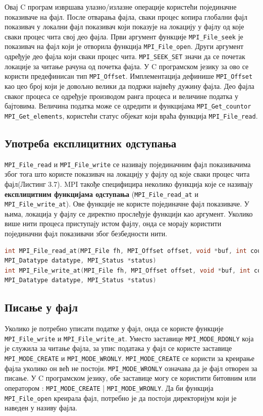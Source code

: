 Овај C програм извршава улазно/излазне операције користећи појединачне показиваче на фајл. После отварања фајла, сваки процес копира глобални фајл показивач у локални фајл показивач који показује на локацију у фајлу од које сваки процес чита свој део фајла. Први аргумент функције \texttt{MPI\_File\_seek} је показивач на фајл који је отворила функција 
\texttt{MPI\_File\_open}. Други аргумент одређује део фајла који сваки процес чита. \texttt{MPI\_SEEK\_SET} значи да се почетак локације за читање рачуна од почетка фајла. У C програмском језику 
за ово се користи предефинисан тип \texttt{MPI\_Offset}. Имплементација дефинише \texttt{MPI\_Offset} као цео број који је довољно велики да подржи највећу дужину фајла. Део фајла сваког процеса се одређује производом ранга процеса и величине податка у бајтовима. Величина податка може се одредити и функцијама \texttt{MPI\_Get\_countor} \texttt{MPI\_Get\_elements}, користећи статус објекат који враћа функција \texttt{MPI\_File\_read}.


\subsection{Употреба експлицитних одступања}

\texttt{MPI\_File\_read} и \texttt{MPI\_File\_write} се називају појединачним фајл показивачима због тога што користе показивач на локацију у фајлу од које сваки процес чита фајл(Листинг 3.7). MPI такође специфицира  неколико функција које се називају \textbf{експлицитним функцијама одступања} (\texttt{MPI\_File\_read\_at} и \texttt{MPI\_File\_write\_at}). Ове функције не користе појединачне фајл показиваче. У њима, локација у фајлу се директно прослеђује функцији као аргумент. Уколико више нити процеса приступају истом фајлу, онда се морају користити појединачни фајл показивачи због безбедности нити.

\begin{lstlisting}[style=nonumbers,frame=single,language=C, caption= MPI функције]
int MPI_File_read_at(MPI_File fh, MPI_Offset offset, void *buf, int count,
MPI_Datatype datatype, MPI_Status *status)
int MPI_File_write_at(MPI_File fh, MPI_Offset offset, void *buf, int count,
MPI_Datatype datatype, MPI_Status *status)
\end{lstlisting}

\subsection{Писање у фајл}
Уколико је потребно уписати податке у фајл, онда се користе функције \texttt{MPI\_File\_write} и \texttt{MPI\_File\_write\_at}. Уместо заставице \texttt{MPI\_MODE\_RDONLY} која је служила за читање фајла, за упис података у фајл се користе заставице \texttt{MPI\_MODE\_CREATE} и \texttt{MPI\_MODE\_WRONLY}. \texttt{MPI\_MODE\_CREATE} се користи за креирање фајла уколико он већ не постоји. \texttt{MPI\_MODE\_WRONLY} означава да је фајл отворен за писање. У C програмском језику, обе заставице могу се користити битовним или оператором :  \texttt{MPI\_MODE\_CREATE} | \texttt{MPI\_MODE\_WRONLY}. Да би функција \texttt{MPI\_File\_open} креирала фајл, потребно је да постоји директоријум који је наведен у називу фајла.

